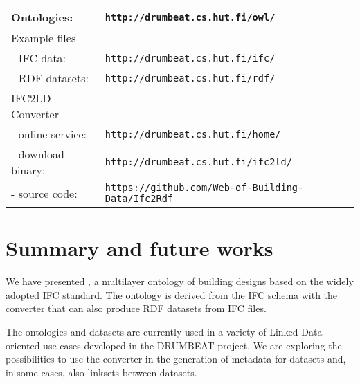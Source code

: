 \noindent
\begin{scriptsize}
\begin{center}
    \def\arraystretch{1.2}
    \setlength{\tabcolsep}{6pt}
    \begin{tabularx}{0.90\textwidth}{|l|X|}
        \hline
        Ontologies: & \texttt{http://drumbeat.cs.hut.fi/owl/} \\
        \hline
        Example files & \\
        - IFC data: & \texttt{http://drumbeat.cs.hut.fi/ifc/} \\
        - RDF datasets: & \texttt{http://drumbeat.cs.hut.fi/rdf/} \\
        \hline
        IFC2LD Converter & \\
        - online service: & \texttt{http://drumbeat.cs.hut.fi/home/} \\
        - download binary: & \texttt{http://drumbeat.cs.hut.fi/ifc2ld/} \\
        - source code: & \texttt{https://github.com/Web-of-Building-Data/Ifc2Rdf} \\
        \hline
    \end{tabularx}
\end{center}
\end{scriptsize}



\section{Summary and future works}
\label{sec:summary}

We have presented \ifcowl{}, a multilayer ontology of building designs based on the widely adopted IFC standard. The ontology is 
derived from the IFC schema with the \ifcld{} converter that can also produce RDF datasets from IFC files. 

The \ifcowl{} ontologies and \ifcrdf{} datasets are currently used in a variety of Linked Data oriented use cases \cite{torma2013semantic} developed in the DRUMBEAT project. We are exploring the possibilities to use the \ifcld{} converter in the generation of metadata for \ifcrdf{} datasets and, in some cases, also linksets between datasets.


